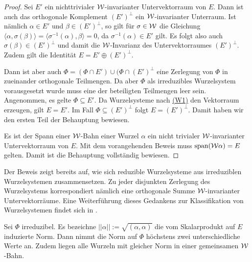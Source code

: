 \begin{proof}
  Sei $E'$ ein nichttrivialer $\mathcal{W}$\hyp{}invarianter Untervektorraum von $E$.
  Dann ist auch das orthogonale Komplement $(E')^\perp$ ein $\mathcal{W}$\hyp{}invarianter Unterraum.
  Ist nämlich $\alpha \in E'$ und $\beta \in (E')^\perp$, so gilt für $\sigma \in \mathcal{W}$ die Gleichung
  $\langle \alpha, \sigma(\beta) \rangle = \langle \sigma^{-1}(\alpha), \beta \rangle = 0$, da $\sigma^{-1}(\alpha) \in E'$ gilt.
  Es folgt also auch $\sigma(\beta) \in (E')^\perp$ und damit die $\mathcal{W}$\hyp{}Invarianz des Untervektorraumes $(E')^\perp$. 
  Zudem gilt die Identität $E = E' \oplus (E')^\perp$.

  Dann ist aber auch $\Phi = (\Phi \cap E') \cup (\Phi \cap (E')^\perp$ eine Zerlegung von $\Phi$ in zueinander orthogonale Teilmengen.
  Da aber $\Phi$ als irreduzibles Wurzelsystem vorausgesetzt wurde muss eine der beteiligten Teilmengen leer sein.
  Angenommen, es gelte $\Phi \subseteq E'$. 
  Da Wurzelsysteme nach \hyperref[it:W1]{(W1)} den Vektorraum erzeugen, gilt $E = E'$. 
  Im Fall $\Phi \subseteq (E')^\perp$ folgt $E = (E')^\perp$.
  Damit haben wir den ersten Teil der Behauptung bewiesen.

  Es ist der Spann einer $\mathcal{W}$\hyp{}Bahn einer Wurzel $\alpha$ ein nicht trivialer $\mathcal{W}$\hyp{}invarianter Untervektorraum von $E$.
  Mit dem vorangehenden Beweis muss $\operatorname{span}(\mathcal{W}\alpha) = E$ gelten.
  Damit ist die Behauptung vollständig bewiesen.
\end{proof}

\begin{bem}
  Der Beweis zeigt bereits auf, wie sich reduzible Wurzelsysteme aus irreduziblen Wurzelsystemen zusammensetzen.
  Zu jeder disjunkten Zerlegung des Wurzelsystems korrespondiert nämlich eine orthogonale Summe $\mathcal{W}$\hyp{}invarianter Untervektorräume.
  Eine Weiterführung dieses Gedankens zur Klassifikation von Wurzelsystemen findet sich in \cite[S.57ff.]{humphreys1972introduction}.
\end{bem}

\begin{lem}
  \label{lem:rootLength}
  Sei $\Phi$ irreduzibel.
  Es bezeichne $||\alpha|| := \sqrt{(\alpha,\alpha)}$ die vom Skalarprodukt auf $E$ induzierte Norm.
  Dann nimmt die Norm auf $\Phi$ höchstens zwei unterschiedliche Werte an.
  Zudem liegen alle Wurzeln mit gleicher Norm in einer gemeinsamen $\mathcal{W}$\hyp{}Bahn.
\end{lem}

